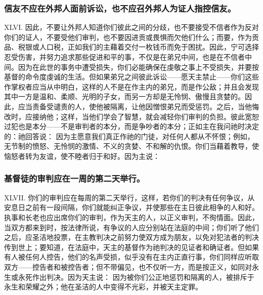 
\subsubsection{信友不应在外邦人面前诉讼，也不应召外邦人为证人指控信友。}

XLVI. 因此，不要让外邦人知道你们彼此之间的分歧，也不要接受不信者作为反对你们的证人，不要受他们审判，也不要因进贡或畏惧而欠他们什么；而要，作为贡品、税银或人口税，正如我们的主藉着交付一枚钱币而免于困扰。因此，宁可选择忍受伤害，并努力追求那些促进和平的事，不仅是在弟兄中间，也是在不信者中间。因为在此世的事务中遭受损失，你们必能确保在虔敬之事上不受损失，并要按基督的命令度虔诚的生活。但如果弟兄之间彼此诉讼——愿天主禁止——你们这些作掌权者应当从中明白，这样的人不是在作主内的弟兄，而是作公敌；并且会发现其中一方是温和、柔顺、光明的子女，而另一方却是无怜悯、傲慢且贪婪的。因此，应当责备受谴责的人，使他被隔离，让他因憎恨弟兄而受惩罚。之后，当他悔改时，应接纳他；这样，当他们学会了智慧，就会减轻你们审判的负担。彼此宽恕过犯也是本分——不是审判者的本分，而是争吵者的本分；正如主在我问祂时决定的：祂回答说： 因为主愿意我们真正作祂的门徒，对任何人都从不怀恨；例如，无节制的愤怒、无怜悯的激情、不义的贪婪、不和解的仇恨。你们当藉着教导，使恼怒者转为友谊，使不睦者归于和好。因为主说：\par


\subsubsection{基督徒的审判应在一周的第二天举行。}

XLVII. 你们的审判应在每周的第二天举行，这样，若你们的判决有任何争议，从安息日之前有一段间隔，你们就能纠正争议，并使那些在主日彼此相争的人和好。执事和长老也应出席你们的审判，作为天主的人，以正义审判，不徇情面。因此，当双方都来到时，按法律所说，有争议的人应分别站在法庭的中间；你们听了他们之后，应圣洁地投票，在主教判决之前努力使双方成为朋友，以免对犯法者的判决传到世上；要知道，在法庭中，天主的基督作为祂判决的见证者和确证者。但如果有人被任何人控告，他们的名声受损，似乎没有在主内正直行事，你们同样应听取双方——控告者和被控告者；但不带偏见，也不仅听一方，而是按正义，如同对永生或永死作出判决。因为天主说： 因为被你们公正地惩罚和隔离的人，被排斥于永生和荣耀之外；他在圣洁的人中变得不光彩，并被天主定罪。\par

